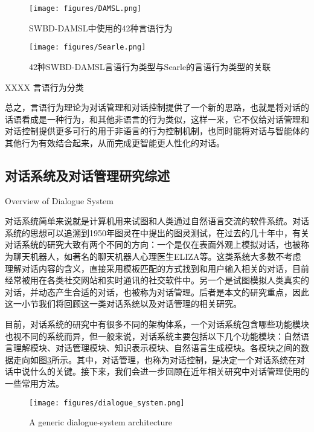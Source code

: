 \begin{figure}[htb]
\centering
\texttt{[image: figures/DAMSL.png]}
\caption{SWBD-DAMSL中使用的42种言语行为}
\label{fig:DAMSL}
\end{figure}

\begin{figure}[htb]
\centering
\texttt{[image: figures/Searle.png]}
\caption{ 42种SWBD-DAMSL言语行为类型与Searle的言语行为类型的关联}
\label{fig:Searle}
\end{figure}

XXXX 言语行为分类

总之，言语行为理论为对话管理和对话控制提供了一个新的思路，也就是将对话的话语看成是一种行为，和其他非语言的行为类似，这样一来，它不仅给对话管理和对话控制提供更多可行的用于非语言的行为控制机制，也同时能将对话与智能体的其他行为有效结合起来，从而完成更智能更人性化的对话。

\subsection{对话系统及对话管理研究综述}{Overview of Dialogue System}

对话系统简单来说就是计算机用来试图和人类通过自然语言交流的软件系统。对话系统的思想可以追溯到1950年图灵在\cite{Turing1950}中提出的图灵测试，在过去的几十年中，有关对话系统的研究大致有两个不同的方向：一个是仅在表面外观上模拟对话，也被称为聊天机器人，如著名的聊天机器人心理医生ELIZA\cite{Weizenbaum1966}等。这类系统大多数不考虑理解对话内容的含义，直接采用模板匹配的方式找到和用户输入相关的对话，目前经常被用在各类社交网站和实时通讯的社交软件中。另一个是试图模拟人类真实的对话，并动态产生合适的对话，也被称为对话管理。后者是本文的研究重点，因此这一小节我们将回顾这一类对话系统以及对话管理的相关研究。

目前，对话系统的研究中有很多不同的架构体系，一个对话系统包含哪些功能模块也视不同的系统而异，但一般来说，对话系统主要包括以下几个功能模块：自然语言理解模块、对话管理模块、知识表示模块、自然语言生成模块。各模块之间的数据走向如图\ref{fig:dialogue}所示\cite{Arora2013}。其中，对话管理，也称为对话控制，是决定一个对话系统在对话中说什么的关键。接下来，我们会进一步回顾在近年相关研究中对话管理使用的一些常用方法。

\begin{figure}[htb]
\centering
\texttt{[image: figures/dialogue\_system.png]}
\caption{ A generic dialogue-system architecture }
\label{fig:dialogue}
\end{figure}

